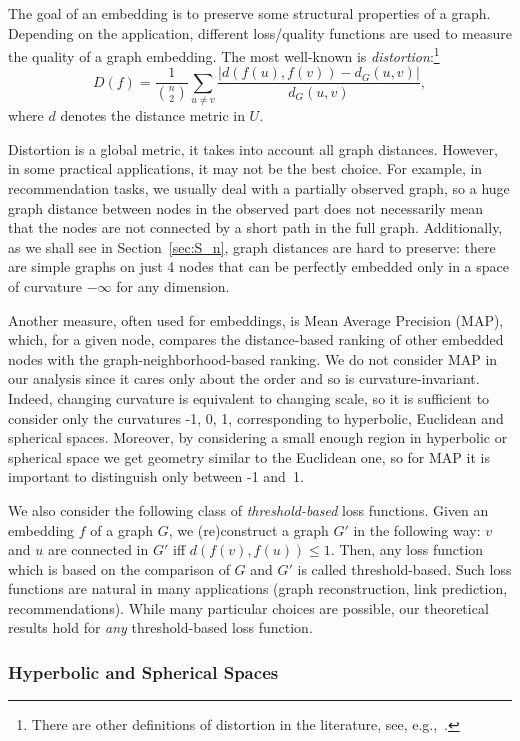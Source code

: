 \documentclass[runningheads]{llncs}
\newcommand{\ch}[1]{{\color{red} #1}}
\begin{document}
The goal of an embedding is to preserve some structural properties of a graph.
Depending on \ch{the} application, different loss/quality functions are used to measure the quality of a graph embedding. The most well-known is \textit{distortion}:\footnote{There are other definitions of distortion in the literature, see, e.g.,~\cite{sala2018representation}.}
\[
D(f) = \frac{1}{{n \choose 2}} \sum_{u \neq v}  \frac{|d(f(u),f(v)) - d_G(u,v)|}{d_G(u,v)},
\]
\ch{where $d$ denotes the distance metric in $U$.}

Distortion is a global metric, it takes into account all graph distances. However, in some practical applications, it may not be the best choice. For example, in recommendation tasks, we usually deal with a partially observed graph, so a huge graph distance between nodes in the observed part does not necessarily mean that the nodes are not connected \ch{by a short path} in the full graph. Additionally, as \ch{we shall see} in Section~\ref{sec:S_n}, graph distances are hard to preserve: there are simple graphs on just 4 nodes that can be perfectly embedded only in a space of curvature $-\infty$ for any dimension.

Another measure, often used for embeddings, is Mean Average Precision (MAP), which, for a given node, compares the distance-based ranking of other embedded nodes with the graph-neighborhood-based ranking. 
We do not consider MAP in our analysis \ch{since} it cares only about the order and so is curvature-invariant.  
Indeed, changing curvature is equivalent to changing scale, so it is sufficient to consider only the curvatures -1, 0, 1, corresponding to hyperbolic, Euclidean and spherical spaces. Moreover, by considering a small enough region in hyperbolic or spherical space we get geometry similar to the Euclidean one, so for MAP it is important to distinguish only between -1 and~1.

\ch{We also consider} the following class of \textit{threshold-based} loss functions. Given an embedding $f$ of a graph $G$, we (re)construct a graph $G'$ in the following way: $v$ and $u$ are connected in $G'$ iff $d(f(v),f(u))\le 1$. Then, any loss function which is based on the comparison of $G$ and $G'$ is called threshold-based. 
Such loss functions are natural in many applications (graph reconstruction, link prediction, recommendations).
While many particular choices are possible, our theoretical results hold for \textit{any} threshold-based loss function.


\subsubsection{Hyperbolic and Spherical Spaces}
\end{document}
